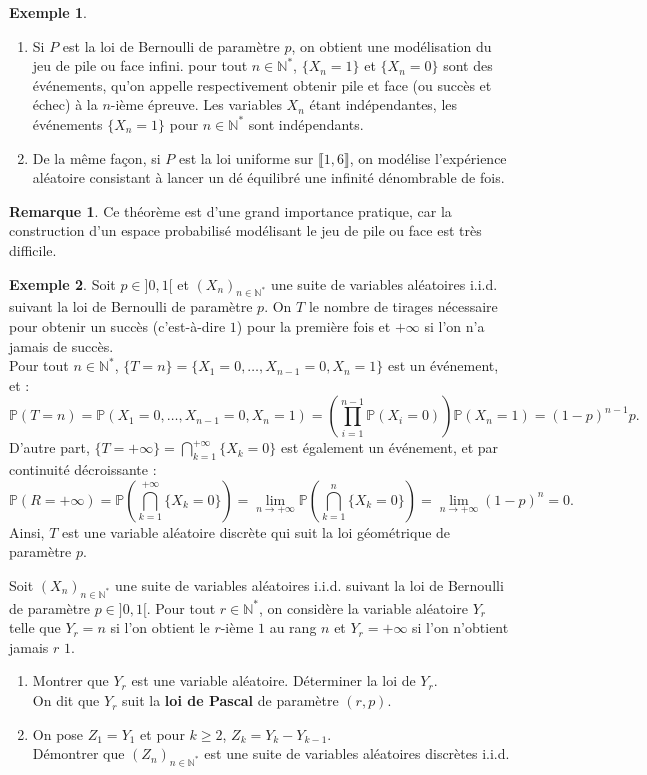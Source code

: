 \documentclass[french]{article}
\renewcommand{\P}{\mathbb{P}}
\newcommand{\N}{\mathbb{N}}
\newcommand{\st}{^*}
\theoremstyle{plain}
\theoremstyle{definition}
\newtheorem*{ex}{Exemple}
\newtheorem*{rmq}{Remarque}
\theoremstyle{remark}
\begin{document}
\begin{ex}
	\begin{enumerate}
		\item Si $P$ est la loi de Bernoulli de paramètre $p$, on obtient une modélisation du jeu de pile ou face infini. pour tout $n\in\N\st$, $\{X_n=1\}$ et $\{X_n=0\}$ sont des événements, qu'on appelle respectivement obtenir pile et face (ou succès et échec) à la $n$-ième épreuve. Les variables $X_n$ étant indépendantes, les événements $\{X_n=1\}$ pour $n\in\N\st$ sont indépendants.
		\item De la même façon, si $P$ est la loi uniforme sur $\llbracket1,6\rrbracket$, on modélise l'expérience aléatoire consistant à lancer un dé équilibré une infinité dénombrable de fois.
	\end{enumerate}
\end{ex}

\begin{rmq}
	Ce théorème est d'une grand importance pratique, car la construction d'un espace probabilisé modélisant le jeu de pile ou face est très difficile.
\end{rmq}

\begin{ex}
	Soit $p\in]0,1[$ et $(X_n)_{n\in\N\st}$ une suite de variables aléatoires i.i.d. suivant la loi de Bernoulli de paramètre $p$. On $T$ le nombre de tirages nécessaire pour obtenir un succès (c'est-à-dire $1$) pour la première fois et $+\infty$ si l'on n'a jamais de succès.\\
	Pour tout $n\in\N\st$, $\{T=n\}=\{X_1=0,\ldots,X_{n-1}=0,X_n=1\}$ est un événement, et :
	$$\P(T=n)=\P(X_1=0,\ldots,X_{n-1}=0,X_n=1)=\left(\prod_{i=1}^{n-1}\P(X_i=0)\right)\P(X_n=1)=(1-p)^{n-1}p.$$ D'autre part, $\{T=+\infty\}=\displaystyle\bigcap_{k=1}^{+\infty}\{X_k=0\}$ est également un événement, et par continuité décroissante :
	$$\P(R=+\infty)=\P\left(\bigcap_{k=1}^{+\infty}\{X_k=0\}\right)=\underset{n\to+\infty}{\lim}\P\left(\bigcap_{k=1}^n\{X_k=0\}\right)=\underset{n\to+\infty}{\lim}(1-p)^n=0.$$
	Ainsi, $T$ est une variable aléatoire discrète qui suit la loi géométrique de paramètre $p$.
\end{ex}

\begin{exo}
	Soit $(X_n)_{n\in\N\st}$ une suite de variables aléatoires i.i.d. suivant la loi de Bernoulli de paramètre $p\in]0,1[$. Pour tout $r\in\N\st$, on considère la variable aléatoire $Y_r$ telle que $Y_r=n$ si l'on obtient le $r$-ième $1$ au rang $n$ et $Y_r=+\infty$ si l'on n'obtient jamais $r$ $1$.
	\begin{enumerate}
		\item Montrer que $Y_r$ est une variable aléatoire. Déterminer la loi de $Y_r$.\\
		On dit que $Y_r$ suit la \textbf{loi de Pascal} de paramètre $(r,p)$.
		\item On pose $Z_1=Y_1$ et pour $k\geqslant2$, $Z_k=Y_k-Y_{k-1}$. \\
		Démontrer que $(Z_n)_{n\in\N\st}$ est une suite de variables aléatoires discrètes i.i.d.
	\end{enumerate}
\end{exo}
\end{document}

